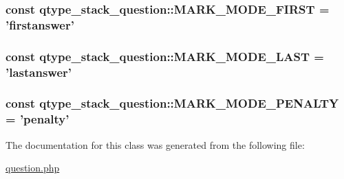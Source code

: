 \label{classqtype__stack__question_a132af9dd30e31dbe58cc5b8b95dc91ef}
\hypertarget{classqtype__stack__question_a790b80668709d381e495a84800db165a}{
\subsubsection[{MARK\_\-MODE\_\-FIRST}]{\setlength{\rightskip}{0pt plus 5cm}const {\bf qtype\_\-stack\_\-question::MARK\_\-MODE\_\-FIRST} = 'firstanswer'}}
\label{classqtype__stack__question_a790b80668709d381e495a84800db165a}
\hypertarget{classqtype__stack__question_aa701dff20296ed3c2c63b82b28636f44}{
\subsubsection[{MARK\_\-MODE\_\-LAST}]{\setlength{\rightskip}{0pt plus 5cm}const {\bf qtype\_\-stack\_\-question::MARK\_\-MODE\_\-LAST} = 'lastanswer'}}
\label{classqtype__stack__question_aa701dff20296ed3c2c63b82b28636f44}
\hypertarget{classqtype__stack__question_a588ba6d7b21ea84f8a71e69e9f02c625}{
\subsubsection[{MARK\_\-MODE\_\-PENALTY}]{\setlength{\rightskip}{0pt plus 5cm}const {\bf qtype\_\-stack\_\-question::MARK\_\-MODE\_\-PENALTY} = 'penalty'}}
\label{classqtype__stack__question_a588ba6d7b21ea84f8a71e69e9f02c625}


The documentation for this class was generated from the following file:\begin{DoxyCompactItemize}
\item 
\hyperlink{question_8php}{question.php}\end{DoxyCompactItemize}
